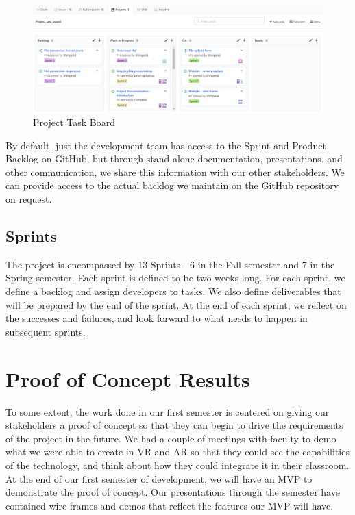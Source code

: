 \begin{figure}[H]
    \centering
    \includegraphics[width=\textwidth]{ProjectTaskBoard.png}
    \caption{Project Task Board}
    \label{fig:ProjectTaskBoard}
\end{figure}

By default, just the development team has access to the Sprint and Product 
Backlog on GitHub, but through stand-alone documentation, presentations, and 
other communication, we share this information with our other stakeholders. 
We can provide access to the actual backlog we maintain on the GitHub repository
on request.

\subsection{Sprints}
The project is encompassed by 13 Sprints - 6 in the Fall semester and 7 in the 
Spring semester. Each sprint is defined to be two weeks long. 
For each sprint, we define a backlog and assign developers to tasks. We also 
define deliverables that will be prepared by the end of the sprint. At the end 
of each sprint, we reflect on the successes and failures, and look forward to 
what needs to happen in subsequent sprints.


\section{Proof of Concept Results}


To some extent, the work done in our first semester is centered on giving our 
stakeholders a proof of concept so that they can begin to drive the requirements
of the project in the future. We had a couple of meetings with faculty to demo 
what we were able to create in VR and AR so that they could see the capabilities
of the technology, and think about how they could integrate it in their 
classroom. At the end of our first semester of development, we will have an MVP
to demonstrate the proof of concept. Our presentations through the semester have 
contained wire frames and demos that reflect the features our MVP will have.

